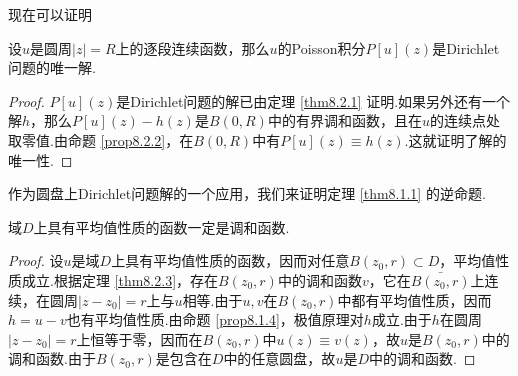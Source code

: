 现在可以证明
\begin{theorem}\label{thm8.2.3}
设$u$是圆周$|z|=R$上的逐段连续函数，那么$u$的Poisson积分$P[u](z)$是Dirichlet问题的唯一解.
\end{theorem}
\begin{proof}
$P[u](z)$是Dirichlet问题的解已由定理 \ref{thm8.2.1} 证明.如果另外还有一个解$h$，那么$P[u](z)-h(z)$是$B(0,R)$中的有界调和函数，且在$u$的连续点处取零值.由命题 \ref{prop8.2.2}，在$B(0,R)$中有$P[u](z)\equiv h(z)$.这就证明了解的唯一性.
\end{proof}

作为圆盘上Dirichlet问题解的一个应用，我们来证明定理 \ref{thm8.1.1} 的逆命题.
\begin{theorem}\label{thm8.2.4}
域$D$上具有平均值性质的函数一定是调和函数.
\end{theorem}
\begin{proof}
设$u$是域$D$上具有平均值性质的函数，因而对任意$B(z_0,r)\subset D$，平均值性质成立.根据定理 \ref{thm8.2.3}，存在$B(z_0,r)$中的调和函数$v$，它在$\bar{B(z_0,r)}$上连续，在圆周$|z-z_0|=r$上与$u$相等.由于$u,v$在$B(z_0,r)$中都有平均值性质，因而$h=u-v$也有平均值性质.由命题 \ref{prop8.1.4}，极值原理对$h$成立.由于$h$在圆周$|z-z_0|=r$上恒等于零，因而在$B(z_0,r)$中$u(z)\equiv v(z)$，故$u$是$B(z_0,r)$中的调和函数.由于$B(z_0,r)$是包含在$D$中的任意圆盘，故$u$是$D$中的调和函数.
\end{proof}

